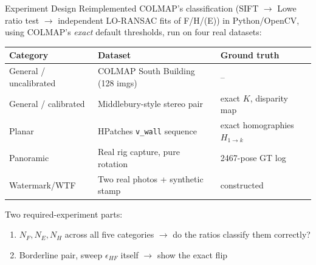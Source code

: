 \documentclass[11pt]{beamer}
\begin{document}
\begin{frame}{Experiment Design}
  Reimplemented COLMAP's classification (SIFT $\to$ Lowe ratio test $\to$ independent
  LO-RANSAC fits of F/H/(E)) in Python/OpenCV, using COLMAP's \emph{exact} default
  thresholds, run on four real datasets:
  \begin{center}
  \scriptsize
  \begin{tabular}{lll}
    \toprule
    \textbf{Category} & \textbf{Dataset} & \textbf{Ground truth} \\
    \midrule
    General / uncalibrated & COLMAP South Building (128 imgs) & -- \\
    General / calibrated & Middlebury-style stereo pair & exact $K$, disparity map \\
    Planar & HPatches \texttt{v\_wall} sequence & exact homographies $H_{1{\to}k}$ \\
    Panoramic & Real rig capture, pure rotation & 2467-pose GT log \\
    Watermark/WTF & Two real photos + synthetic stamp & constructed \\
    \bottomrule
  \end{tabular}
  \end{center}
  \vspace{0.2cm}
  Two required-experiment parts:
  \begin{enumerate}
    \item[\textbf{(1)}] $N_F,N_E,N_H$ across all five categories $\to$ do the ratios classify them correctly?
    \item[\textbf{(2)}] Borderline pair, sweep $\epsilon_{HF}$ itself $\to$ show the exact flip
  \end{enumerate}
\end{frame}
\end{document}
